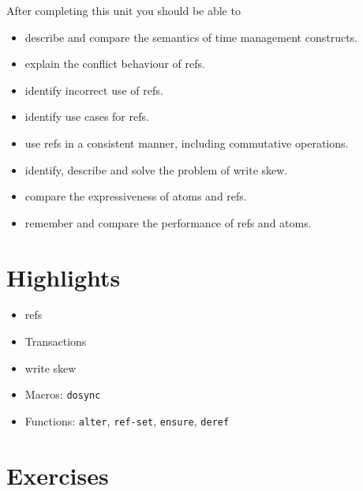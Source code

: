 \documentclass[11pt,a4paper]{article}
\begin{document}
After completing this unit you should be able to

\begin{itemize}
	\item describe and compare the semantics of time management constructs.
    \item explain the conflict behaviour of refs.
    \item identify incorrect use of refs.
    \item identify use cases for refs.
    \item use refs in a consistent manner, including commutative operations.
    \item identify, describe and solve the problem of write skew.
    \item compare the expressiveness of atoms and refs.
    \item remember and compare the performance of refs and atoms.
\end{itemize}

\section{Highlights}

\begin{itemize}
    \item refs 
    \item Transactions
    \item write skew
    \item Macros: \verb|dosync|
    \item Functions: \verb|alter|, \verb|ref-set|, \verb|ensure|, \verb|deref|
\end{itemize}



\section{Exercises}
\end{document}
